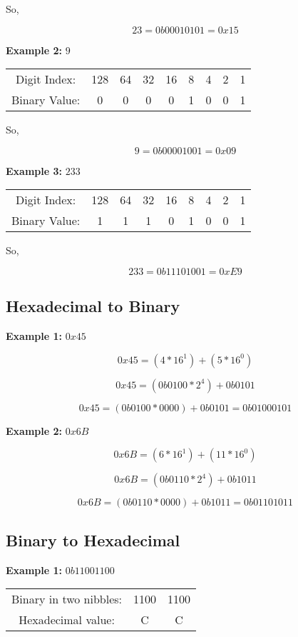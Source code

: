 \documentclass{article}
\begin{document}
So,

\[
23 = 0b0001 0101 = 0x15
\]

\noindent \textbf{Example 2:} $9$ 

\begin{center}
\begin{tabular}{c c c c c c c c c}
Digit Index: & 128 & 64 & 32 & 16 & 8 & 4 & 2 & 1 \\
Binary Value: & 0 & 0 & 0 & 0 & 1 & 0 & 0 & 1 \\
\end{tabular}
\end{center} 

So, 

\[
9 = 0b0000 1001 = 0x09
\]

\noindent \textbf{Example 3:} $233$

\begin{center}
\begin{tabular}{c c c c c c c c c}
Digit Index: & 128 & 64 & 32 & 16 & 8 & 4 & 2 & 1 \\
Binary Value: & 1 & 1 & 1 & 0 & 1 & 0 & 0 & 1 \\
\end{tabular}
\end{center} 

So,

\[
233 = 0b1110 1001 = 0xE9
\]

\subsection*{Hexadecimal to Binary}
\textbf{Example 1:} $0x45$

\[
0x45 = (4 * 16^1) + (5 * 16^0)
\]

\[
0x45 = (0b0100 * 2^4) + 0b0101
\]

\[
0x45 = (0b0100 * 0000) + 0b0101 = 0b0100 0101 
\]

\noindent \textbf{Example 2:} $0x6B$

\[
0x6B = (6 * 16^1) + (11 * 16^0)
\]

\[
0x6B = (0b0110 * 2^4) + 0b1011
\]

\[
0x6B = (0b0110 * 0000) + 0b1011 = 0b0110 1011
\]

\subsection*{Binary to Hexadecimal}
\textbf{Example 1:} $0b1100 1100$

\begin{center}
\begin{tabular}{c c c}
Binary in two nibbles: & 1100 & 1100 \\
Hexadecimal value: & C & C \\
\end{tabular}
\end{center}
\end{document}
